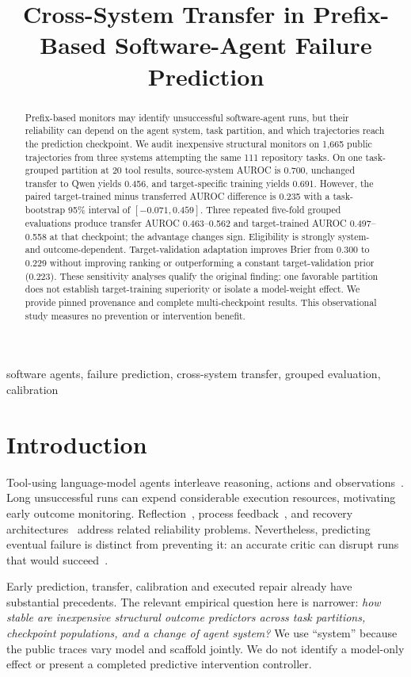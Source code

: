 \documentclass[conference]{IEEEtran}
\title{Cross-System Transfer in Prefix-Based Software-Agent Failure Prediction}
\author{\IEEEauthorblockN{Yuvaraj Nayak}\IEEEauthorblockA{Department of Computer Science\\BITS Pilani, Dubai Campus\\Dubai, United Arab Emirates\\f20230006@dubai.bits-pilani.ac.in}}
\begin{document}
\maketitle
\begin{abstract}
Prefix-based monitors may identify unsuccessful software-agent runs, but their reliability can depend on the agent system, task partition, and which trajectories reach the prediction checkpoint. We audit inexpensive structural monitors on 1,665 public trajectories from three systems attempting the same 111 repository tasks. On one task-grouped partition at 20 tool results, source-system AUROC is 0.700, unchanged transfer to Qwen yields 0.456, and target-specific training yields 0.691. However, the paired target-trained minus transferred AUROC difference is 0.235 with a task-bootstrap 95\% interval of $[-0.071,0.459]$. Three repeated five-fold grouped evaluations produce transfer AUROC 0.463--0.562 and target-trained AUROC 0.497--0.558 at that checkpoint; the advantage changes sign. Eligibility is strongly system- and outcome-dependent. Target-validation adaptation improves Brier from 0.300 to 0.229 without improving ranking or outperforming a constant target-validation prior (0.223). These sensitivity analyses qualify the original finding: one favorable partition does not establish target-training superiority or isolate a model-weight effect. We provide pinned provenance and complete multi-checkpoint results. This observational study measures no prevention or intervention benefit.
\end{abstract}
\begin{IEEEkeywords}
software agents, failure prediction, cross-system transfer, grouped evaluation, calibration
\end{IEEEkeywords}

\section{Introduction}
Tool-using language-model agents interleave reasoning, actions and observations~\cite{react}. Long unsuccessful runs can expend considerable execution resources, motivating early outcome monitoring. Reflection~\cite{reflexion}, process feedback~\cite{sweprm}, and recovery architectures~\cite{selfhealing} address related reliability problems. Nevertheless, predicting eventual failure is distinct from preventing it: an accurate critic can disrupt runs that would succeed~\cite{interventionparadox}.

Early prediction, transfer, calibration and executed repair already have substantial precedents. The relevant empirical question here is narrower: \emph{how stable are inexpensive structural outcome predictors across task partitions, checkpoint populations, and a change of agent system?} We use ``system'' because the public traces vary model and scaffold jointly. We do not identify a model-only effect or present a completed predictive intervention controller.
\end{document}
